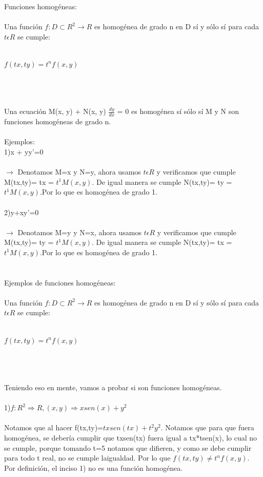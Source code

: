 \documentclass[a4paper,10pt]{article}
\begin{document}
Funciones homogéneas:\\\\
Una función $f: D \subset R^2 \rightarrow R$ es homogénea de grado n en D sí y sólo sí para cada $t \epsilon R$ se cumple:\\\\
\centerline{$f(tx, ty) = t^n f(x,y)$}\\\\\\
Una ecuación M(x, y) + N(x, y) $\frac{dy}{dx}$ = 0 es homogénea sí sólo sí M y N son funciones homogéneas de grado n.\\\\
Ejemplos:\\
1)x + yy'=0 \\\\
$\rightarrow$ Denotamos M=x y N=y, ahora usamos $t\epsilon R$ y verificamos que cumple M(tx,ty)= tx = $t^1 M(x,y)$. De igual manera se cumple N(tx,ty)= ty = $t^1 M(x,y)$.Por lo que es homogénea de grado 1.\\\\
2)y+xy'=0\\\\
$\rightarrow$ Denotamos M=y y N=x, ahora usamos $t\epsilon R$ y verificamos que cumple M(tx,ty)= ty = $t^1 M(x,y)$. De igual manera se cumple N(tx,ty)= tx = $t^1 M(x,y)$.Por lo que es homogénea de grado 1.\\\\\\
Ejemplos de funciones homogéneas:\\\\
Una función $f: D \subset R^2 \rightarrow R$ es homogénea de grado n en D sí y sólo sí para cada $t \epsilon R$ se cumple:\\\\
\centerline{$f(tx, ty) = t^n f(x,y)$}\\\\\\
Teniendo eso en mente, vamos a probar si son funciones homogéneas.\\\\
1)$f: R^2 \Rightarrow R, (x,y)\Rightarrow xsen(x) + y^2 $ \\\\
Notamos que al hacer f(tx,ty)=$tx sen(tx) + t^2y^2$. Notamos que para que fuera homogénea, se debería cumplir que txsen(tx) fuera igual a tx*tsen(x), lo cual no se cumple, porque tomando t=5 notamos que difieren, y como se debe cumplir para todo t real, no se cumple laigualdad. Por lo que $f(tx,ty)\neq t^n f(x,y)$. Por definición, el inciso 1) no es una función homogénea.\\\\
\end{document}
